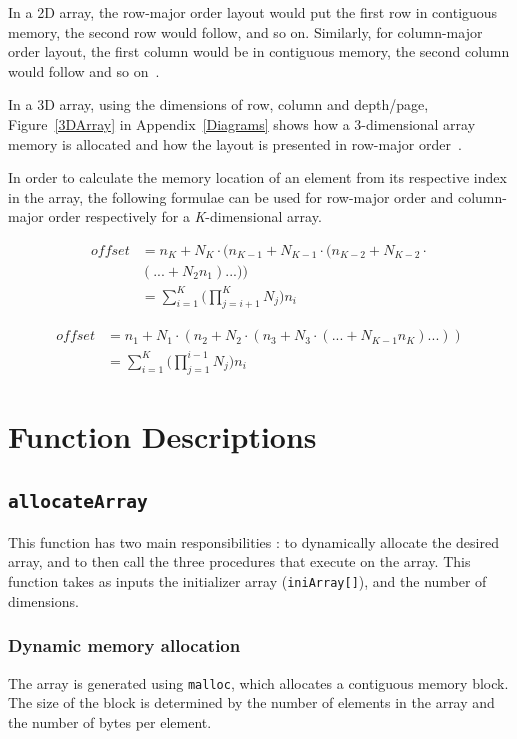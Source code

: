 \documentclass[10pt, conference]{IEEEtran}
\begin{document}
In a 2D array, the row-major order layout would put the first row in contiguous memory, the second row would follow, and so on. Similarly, for column-major order layout, the first column would be in contiguous memory, the second column would follow and so on~\cite{Eli}.

In a 3D array, using the dimensions of row, column and depth/page, Figure~\ref{3DArray} in Appendix~\ref{Diagrams} shows how a 3-dimensional array memory is allocated and how the layout is presented in row-major order~\cite{Eli}.

In order to calculate the memory location of an element from its respective index in the array, the following formulae can be used for row-major order and column-major order respectively for a \emph{K}-dimensional array.


\begin{equation}
\label{eqn1}
\begin{split}
offset &= n_K + N_K \cdot (n_{K-1} +N_{K-1} \cdot (n_{K-2} +N_{K-2} \cdot\\& (...+N_2n_1)...) )\\
&= \sum_{i=1}^{K} \bigg(\prod_{j=i+1}^{K} N_j \bigg) n_i
\end{split}
\end{equation}

\begin{equation}
\label{eqn2}
\begin{split}
offset &= n_1 + N_1 \cdot (n_2 +N_2 \cdot (n_3 +N_3 \cdot (...+N_{K-1}n_K)...) )\\
	&= \sum_{i=1}^{K} \bigg(\prod_{j=1}^{i-1} N_j \bigg) n_i
\end{split}
\end{equation}

\section{Function Descriptions}
\label{Function Description}
\subsection{\texttt{allocateArray}}
This function has two main responsibilities : to dynamically allocate the desired array, and to then call the three procedures that execute on the array.
This function takes as inputs the initializer array (\texttt{iniArray[]}), and the number of dimensions.

\subsubsection{Dynamic memory allocation}
The array is generated using \texttt{malloc}, which allocates a contiguous memory block. The size of the block is determined by the number of elements in the array and the number of bytes per element.
\end{document}
